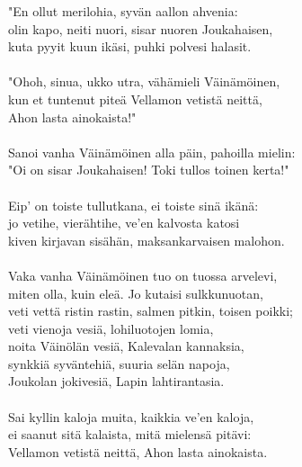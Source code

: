 "En ollut merilohia, syvän aallon ahvenia:               \\
olin kapo, neiti nuori, sisar nuoren Joukahaisen,        \\
kuta pyyit kuun ikäsi, puhki polvesi halasit.            \\
                                                         \\
"Ohoh, sinua, ukko utra, vähämieli Väinämöinen,          \\
kun et tuntenut piteä Vellamon vetistä neittä,           \\
Ahon lasta ainokaista!"                                  \\
                                                         \\
Sanoi vanha Väinämöinen alla päin, pahoilla mielin:      \\
"Oi on sisar Joukahaisen! Toki tullos toinen kerta!"     \\
                                                         \\
Eip' on toiste tullutkana, ei toiste sinä ikänä:         \\
jo vetihe, vierähtihe, ve'en kalvosta katosi             \\
kiven kirjavan sisähän, maksankarvaisen malohon.         \\
                                                         \\
Vaka vanha Väinämöinen tuo on tuossa arvelevi,           \\
miten olla, kuin eleä. Jo kutaisi sulkkunuotan,          \\
veti vettä ristin rastin, salmen pitkin, toisen poikki;  \\
veti vienoja vesiä, lohiluotojen lomia,                  \\
noita Väinölän vesiä, Kalevalan kannaksia,               \\
synkkiä syväntehiä, suuria selän napoja,                 \\
Joukolan jokivesiä, Lapin lahtirantasia.                 \\
                                                         \\
Sai kyllin kaloja muita, kaikkia ve'en kaloja,           \\
ei saanut sitä kalaista, mitä mielensä pitävi:           \\
Vellamon vetistä neittä, Ahon lasta ainokaista.          \\
